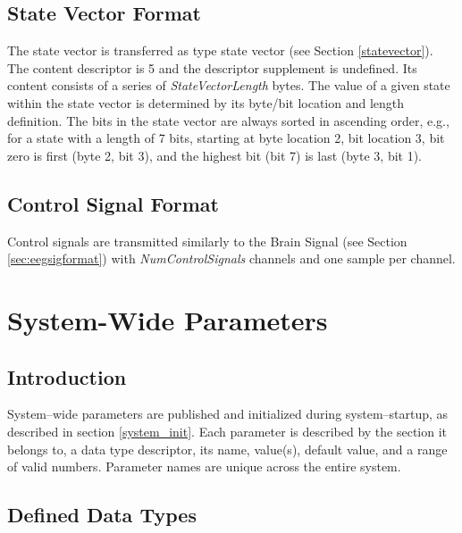 \documentclass[letterpaper,oneside,12pt]{book}
\begin{document}
\subsection{State Vector Format}
\label{statevector_format}

The state vector is transferred as type state vector (see Section 
\ref{statevector}). The content descriptor is 5 and the descriptor supplement is 
undefined. Its content consists of a series of \textit{StateVectorLength} bytes. 
The value of a given state within the state vector is determined by its byte/bit 
location and length definition. The bits in the state vector are always sorted 
in ascending order, e.g., for a state with a length of 7 bits, starting at byte 
location 2, bit location 3, bit zero is first (byte 2, bit 3), and the highest 
bit (bit 7) is last (byte 3, bit 1).

\subsection{Control Signal Format}

Control signals are transmitted similarly to the Brain Signal (see Section 
\ref{sec:eegsigformat}) with \textit{NumControlSignals} channels and one sample 
per channel.


\section{System-Wide Parameters}
\label{system_params}

\subsection{Introduction}

System--wide parameters are published and initialized during system--startup, as 
described in section \ref{system_init}. Each parameter is described by the 
section it belongs to, a data type descriptor, its name, value(s), default 
value, and a range of valid numbers. Parameter names are unique across the 
entire system.

\subsection{Defined Data Types}

\vspace{.5cm}
\end{document}
